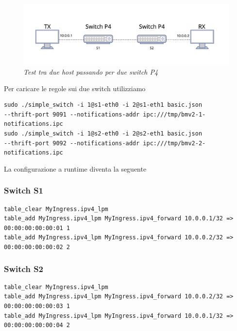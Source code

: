 \FloatBarrier
\begin{figure}[h]
\includegraphics[scale=0.5]{images/p4_double.png}
\centering
\caption{\textit{Test tra due host passando per due switch P4}}
\label{fig:p4_double}
\vspace{1cm}
\end{figure}
\FloatBarrier
\leavevmode\newline
Per caricare le regole sui due switch utilizziamo
\begin{verbatim}
sudo ./simple_switch -i 1@s1-eth0 -i 2@s1-eth1 basic.json
--thrift-port 9091 --notifications-addr ipc:///tmp/bmv2-1-notifications.ipc
sudo ./simple_switch -i 1@s2-eth0 -i 2@s2-eth1 basic.json 
--thrift-port 9092 --notifications-addr ipc:///tmp/bmv2-2-notifications.ipc
\end{verbatim}
La configurazione a runtime diventa la seguente 
\subsubsection*{Switch S1}
\begin{verbatim}
table_clear MyIngress.ipv4_lpm
table_add MyIngress.ipv4_lpm MyIngress.ipv4_forward 10.0.0.1/32 => 00:00:00:00:00:01 1
table_add MyIngress.ipv4_lpm MyIngress.ipv4_forward 10.0.0.2/32 => 00:00:00:00:00:02 2
\end{verbatim}
\subsubsection*{Switch S2}
\begin{verbatim}
table_clear MyIngress.ipv4_lpm
table_add MyIngress.ipv4_lpm MyIngress.ipv4_forward 10.0.0.2/32 => 00:00:00:00:00:03 1
table_add MyIngress.ipv4_lpm MyIngress.ipv4_forward 10.0.0.1/32 => 00:00:00:00:00:04 2
\end{verbatim}